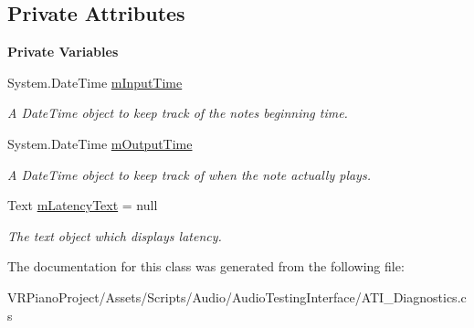 \subsection*{Private Attributes}
\begin{Indent}\textbf{ Private Variables}\par
\begin{DoxyCompactItemize}
\item 
\mbox{\label{class_a_t_i___diagnostics_a683f09700eab208b7368ebcb82bbd3be}} 
System.\+Date\+Time \hyperlink{class_a_t_i___diagnostics_a683f09700eab208b7368ebcb82bbd3be}{m\+Input\+Time}
\begin{DoxyCompactList}\small\item\em A Date\+Time object to keep track of the note\textquotesingle{}s beginning time. \end{DoxyCompactList}\item 
\mbox{\label{class_a_t_i___diagnostics_a2e6f675a990948db789381f52071e1bf}} 
System.\+Date\+Time \hyperlink{class_a_t_i___diagnostics_a2e6f675a990948db789381f52071e1bf}{m\+Output\+Time}
\begin{DoxyCompactList}\small\item\em A Date\+Time object to keep track of when the note actually plays. \end{DoxyCompactList}\item 
\mbox{\label{class_a_t_i___diagnostics_a8929a6a2ae14ec733b936a72cb0f44a6}} 
Text \hyperlink{class_a_t_i___diagnostics_a8929a6a2ae14ec733b936a72cb0f44a6}{m\+Latency\+Text} = null
\begin{DoxyCompactList}\small\item\em The text object which displays latency. \end{DoxyCompactList}\end{DoxyCompactItemize}
\end{Indent}


The documentation for this class was generated from the following file\+:\begin{DoxyCompactItemize}
\item 
V\+R\+Piano\+Project/\+Assets/\+Scripts/\+Audio/\+Audio\+Testing\+Interface/A\+T\+I\+\_\+\+Diagnostics.\+cs\end{DoxyCompactItemize}
